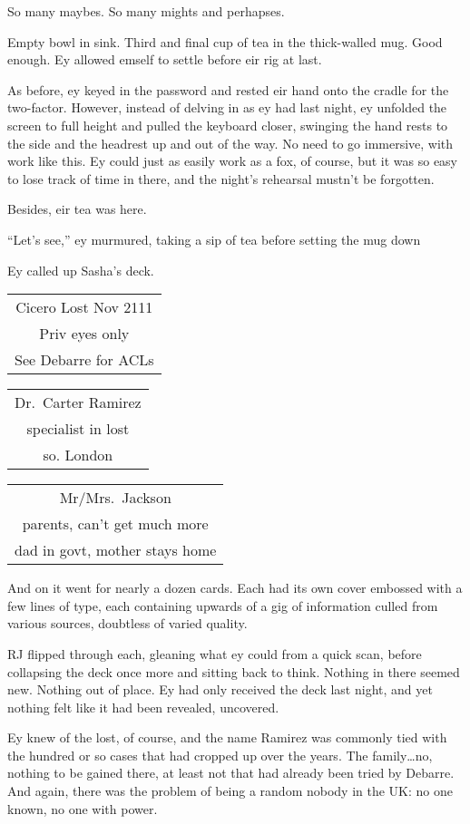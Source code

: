 So many maybes. So many mights and perhapses.

Empty bowl in sink. Third and final cup of tea in the thick-walled mug. Good enough. Ey allowed emself to settle before eir rig at last.

As before, ey keyed in the password and rested eir hand onto the cradle for the two-factor. However, instead of delving in as ey had last night, ey unfolded the screen to full height and pulled the keyboard closer, swinging the hand rests to the side and the headrest up and out of the way. No need to go immersive, with work like this. Ey could just as easily work as a fox, of course, but it was so easy to lose track of time in there, and the night's rehearsal mustn't be forgotten.

Besides, eir tea was here.

``Let's see,'' ey murmured, taking a sip of tea before setting the mug down

Ey called up Sasha's deck.

\begin{longtable}[]{@{}c@{}}
\toprule
\endhead
Cicero Lost Nov 2111\tabularnewline
Priv eyes only\tabularnewline
See Debarre for ACLs\tabularnewline
\bottomrule
\end{longtable}

\begin{longtable}[]{@{}c@{}}
\toprule
\endhead
Dr.~Carter Ramirez\tabularnewline
specialist in lost\tabularnewline
so. London\tabularnewline
\bottomrule
\end{longtable}

\begin{longtable}[]{@{}c@{}}
\toprule
\endhead
Mr/Mrs.~Jackson\tabularnewline
parents, can't get much more\tabularnewline
dad in govt, mother stays home\tabularnewline
\bottomrule
\end{longtable}

And on it went for nearly a dozen cards. Each had its own cover embossed with a few lines of type, each containing upwards of a gig of information culled from various sources, doubtless of varied quality.

RJ flipped through each, gleaning what ey could from a quick scan, before collapsing the deck once more and sitting back to think. Nothing in there seemed new. Nothing out of place. Ey had only received the deck last night, and yet nothing felt like it had been revealed, uncovered.

Ey knew of the lost, of course, and the name Ramirez was commonly tied with the hundred or so cases that had cropped up over the years. The family\ldots{}no, nothing to be gained there, at least not that had already been tried by Debarre. And again, there was the problem of being a random nobody in the UK: no one known, no one with power.

